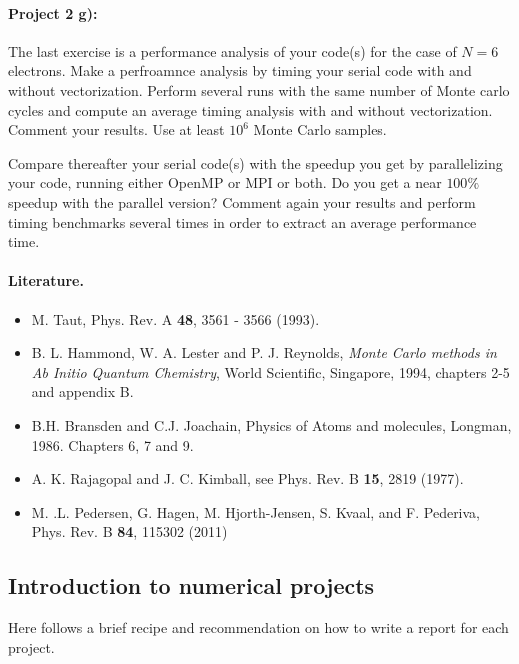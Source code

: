 \documentclass[%
oneside,                 %
final,                   %
10pt]{article}
\begin{document}
\paragraph{Project 2 g):}
The last exercise  is a performance analysis of your code(s) for the case of $N=6$ electrons. Make a perfroamnce analysis by timing your serial code
with and without vectorization. Perform several runs with the same number of Monte carlo cycles and compute an average timing analysis
with and without vectorization. Comment your results. Use at least $10^6$ Monte Carlo samples. 

Compare thereafter your serial code(s)  with the speedup you get by parallelizing your code, running either OpenMP or MPI or both.
Do you get a near $100\%$ speedup with the parallel version? Comment again your results and perform timing benchmarks several times in order 
to extract  an average performance time. 



\paragraph{Literature.}
\begin{itemize}
  \item M. Taut, Phys. Rev. A \textbf{48}, 3561 - 3566 (1993).

  \item B. L. Hammond, W. A. Lester and P. J. Reynolds, \emph{Monte Carlo methods in Ab Initio Quantum Chemistry}, World Scientific, Singapore, 1994, chapters 2-5 and appendix B.

  \item B.H. Bransden and C.J. Joachain, Physics of Atoms and molecules, Longman, 1986. Chapters 6, 7 and 9.

  \item A. K.  Rajagopal and J. C. Kimball, see Phys. Rev. B \textbf{15}, 2819 (1977).

  \item M. .L. Pedersen, G. Hagen, M. Hjorth-Jensen, S. Kvaal,  and F. Pederiva, Phys. Rev. B \textbf{84}, 115302 (2011)
\end{itemize}

\noindent
\subsection*{Introduction to numerical projects}

Here follows a brief recipe and recommendation on how to write a report for each
project.
\end{document}
